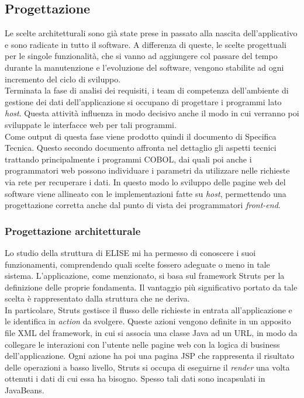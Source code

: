 	\subsection{Progettazione}
	
	Le scelte architetturali sono già state prese in passato alla nascita dell'applicativo e sono radicate in tutto il software. A differenza di queste, le scelte progettuali per le singole funzionalità, che si vanno ad aggiungere col passare del tempo durante la manutenzione e l'evoluzione del software, vengono stabilite ad ogni incremento del ciclo di sviluppo. \\
	
	Terminata la fase di analisi dei requisiti, i team di competenza dell'ambiente di gestione dei dati dell'applicazione si occupano di progettare i programmi lato \textit{host}. Questa attività influenza in modo decisivo anche il modo in cui verranno poi sviluppate le interfacce web per tali programmi.\\
	
	Come output di questa fase viene prodotto quindi il documento di Specifica Tecnica. Questo secondo documento affronta nel dettaglio gli aspetti tecnici trattando principalmente i programmi COBOL\glossario , dai quali poi anche i programmatori web possono individuare i parametri da utilizzare nelle richieste via rete per recuperare i dati. In questo modo lo sviluppo delle pagine web del software viene allineato con le implementazioni fatte su \textit{host}, permettendo una progettazione corretta anche dal punto di vista dei programmatori \textit{front-end}.\\
	
	\subsubsection{Progettazione architetturale}	
	
	Lo studio della struttura di ELISE mi ha permesso di conoscere i suoi funzionamenti, comprendendo quali scelte fossero adeguate o meno in tale sistema. L'applicazione, come menzionato, si basa sul framework Struts per la definizione delle proprie fondamenta. Il vantaggio più significativo portato da tale scelta è rappresentato dalla struttura che ne deriva. \\
	
	In particolare, Struts gestisce il flusso delle richieste in entrata all'applicazione e le identifica in \textit{action} da svolgere. Queste azioni vengono definite in un apposito file XML del framework, in cui si associa una classe Java ad un URL, in modo da collegare le interazioni con l'utente nelle pagine web con la logica di business dell'applicazione. Ogni azione ha poi una pagina JSP che rappresenta il risultato delle operazioni a basso livello, Struts si occupa di eseguirne il \textit{render} una volta ottenuti i dati di cui essa ha bisogno. Spesso tali dati sono incapsulati in JavaBeans\glossario .\\
	
